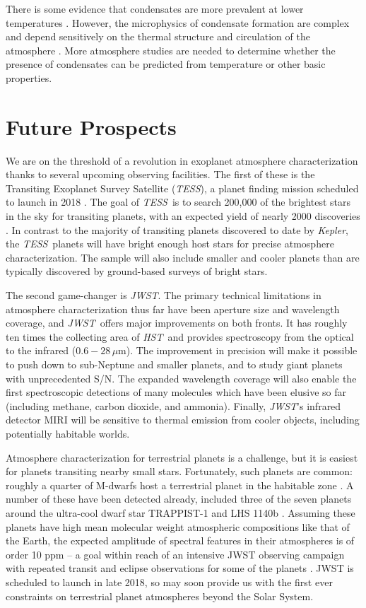 \documentclass[graybox,natbib,nosecnum]{svmult}
\newcommand{\project}[1]{\textsl{#1}}
\newcommand{\JWST}{\project{JWST}}
\newcommand{\HST}{\project{HST}}
\newcommand{\TESS}{\project{TESS}}
\newcommand{\Kepler}{\project{Kepler}}
\begin{document}
There is some evidence that condensates are more prevalent at lower temperatures \citep{stevenson16, heng16}. However, the microphysics of condensate formation are complex and depend sensitively on the thermal structure and circulation of the atmosphere \citep{turco79}. More atmosphere studies are needed to determine whether the presence of condensates can be predicted from temperature or other basic properties.

\section{Future Prospects}
We are on the threshold of a revolution in exoplanet atmosphere characterization thanks to several upcoming observing facilities.  The first of these is the Transiting Exoplanet Survey Satellite (\TESS), a planet finding mission scheduled to launch in 2018 \citep{ricker14}.  The goal of \TESS\ is to search 200,000 of the brightest stars in the sky for transiting planets, with an expected yield of nearly 2000 discoveries \citep{sullivan15}. In contrast to the majority of transiting planets discovered to date by \Kepler, the \TESS\ planets will have bright enough host stars for precise atmosphere characterization. The sample will also include smaller and cooler planets than are typically discovered by ground-based surveys of bright stars. 

The second game-changer is \JWST. The primary technical limitations in atmosphere characterization thus far have been aperture size and wavelength coverage, and \JWST\ offers major improvements on both fronts. It has roughly ten times the collecting area of \HST\, and provides spectroscopy from the optical to the infrared ($0.6 - 28\,\mu$m). The improvement in precision will make it possible to push down to sub-Neptune and smaller planets, and to study giant planets with unprecedented S/N. The expanded wavelength coverage will also enable the first spectroscopic detections of many molecules which have been elusive so far (including methane, carbon dioxide, and ammonia). Finally, \JWST's infrared detector MIRI will be sensitive to thermal emission from cooler objects, including potentially habitable worlds.

Atmosphere characterization for terrestrial planets is a challenge, but it is easiest for planets transiting nearby small stars.  Fortunately, such planets are common: roughly a quarter of M-dwarfs host a terrestrial planet in the habitable zone \citep{dressing15}. A number of these have been detected already, included three of the seven planets around the ultra-cool dwarf star TRAPPIST-1 and LHS 1140b \citep{gillon17, dittmann17}. Assuming these planets have high mean molecular weight atmospheric compositions like that of the Earth, the expected amplitude of spectral features in their atmospheres is of order 10 ppm -- a goal within reach of an intensive JWST observing campaign with repeated transit and eclipse observations for some of the planets \citep{morley17b}.  JWST is scheduled to launch in late 2018, so may soon provide us with the first ever constraints on terrestrial planet atmospheres beyond the Solar System. 
\end{document}
